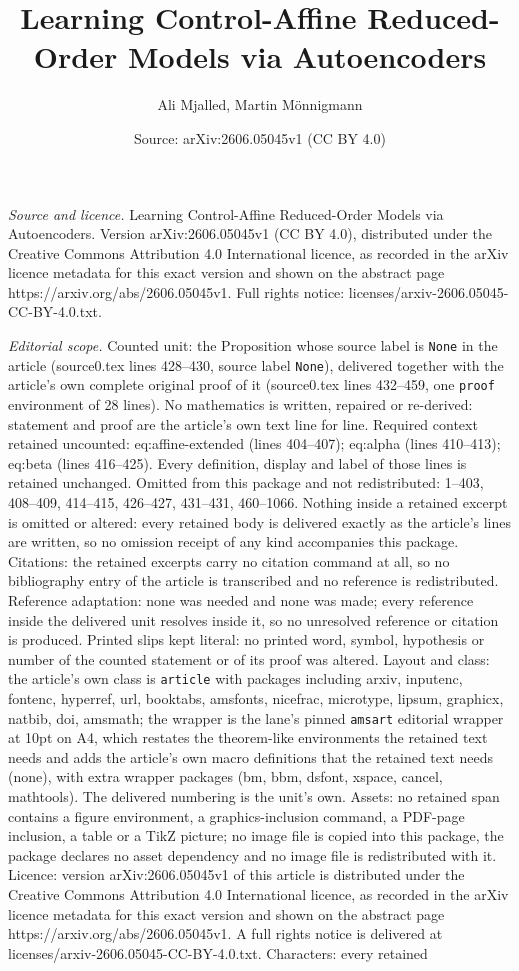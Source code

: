 \documentclass[10pt,a4paper]{amsart}
\title[Learning Control-Affine Reduced-Order Models via Autoencoder]{Learning Control-Affine Reduced-Order Models via Autoencoders}
\author{Ali Mjalled, Martin M\"onnigmann}
\date{Source: arXiv:2606.05045v1 (CC BY 4.0)}
\begin{document}
\maketitle

\noindent\emph{Source and licence.} Learning Control-Affine Reduced-Order Models via Autoencoders. Version arXiv:2606.05045v1 (CC BY 4.0), distributed under the Creative Commons Attribution 4.0 International licence, as recorded in the arXiv licence metadata for this exact version and shown on the abstract page https://arxiv.org/abs/2606.05045v1. Full rights notice: licenses/arxiv-2606.05045-CC-BY-4.0.txt.\par\smallskip

\noindent\textit{Editorial scope.} Counted unit: the Proposition whose source label is \texttt{None} in the article (source0.tex lines 428--430, source label \texttt{None}), delivered together with the article's own complete original proof of it (source0.tex lines 432--459, one \texttt{proof} environment of 28 lines). No mathematics is written, repaired or re-derived: statement and proof are the article's own text line for line. Required context retained uncounted: eq:affine-extended (lines 404--407); eq:alpha (lines 410--413); eq:beta (lines 416--425). Every definition, display and label of those lines is retained unchanged. Omitted from this package and not redistributed: 1--403, 408--409, 414--415, 426--427, 431--431, 460--1066. Nothing inside a retained excerpt is omitted or altered: every retained body is delivered exactly as the article's lines are written, so no omission receipt of any kind accompanies this package. Citations: the retained excerpts carry no citation command at all, so no bibliography entry of the article is transcribed and no reference is redistributed. Reference adaptation: none was needed and none was made; every reference inside the delivered unit resolves inside it, so no unresolved reference or citation is produced. Printed slips kept literal: no printed word, symbol, hypothesis or number of the counted statement or of its proof was altered. Layout and class: the article's own class is \texttt{article} with packages including arxiv, inputenc, fontenc, hyperref, url, booktabs, amsfonts, nicefrac, microtype, lipsum, graphicx, natbib, doi, amsmath; the wrapper is the lane's pinned \texttt{amsart} editorial wrapper at 10pt on A4, which restates the theorem-like environments the retained text needs and adds the article's own macro definitions that the retained text needs (none), with extra wrapper packages (bm, bbm, dsfont, xspace, cancel, mathtools). The delivered numbering is the unit's own. Assets: no retained span contains a figure environment, a graphics-inclusion command, a PDF-page inclusion, a table or a TikZ picture; no image file is copied into this package, the package declares no asset dependency and no image file is redistributed with it. Licence: version arXiv:2606.05045v1 of this article is distributed under the Creative Commons Attribution 4.0 International licence, as recorded in the arXiv licence metadata for this exact version and shown on the abstract page https://arxiv.org/abs/2606.05045v1. A full rights notice is delivered at licenses/arxiv-2606.05045-CC-BY-4.0.txt. Characters: every retained 
\end{document}
